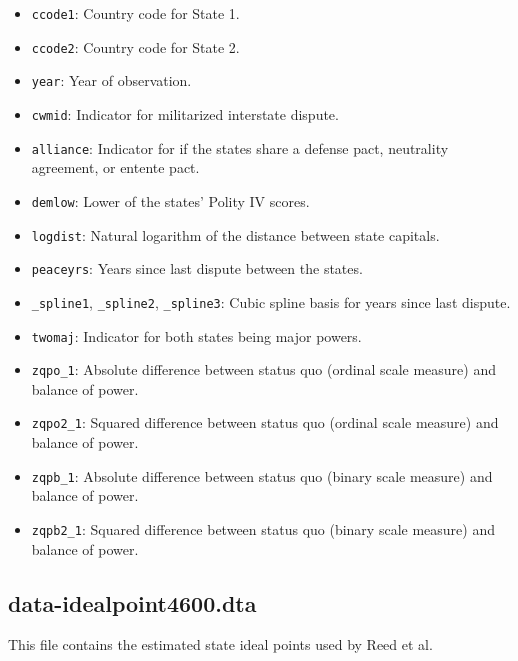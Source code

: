 \documentclass[12pt]{article}
\begin{document}
\begin{itemize}
  \item \texttt{ccode1}: Country code for State 1.
  \item \texttt{ccode2}: Country code for State 2.
  \item \texttt{year}: Year of observation.
  \item \texttt{cwmid}: Indicator for militarized interstate dispute.
  \item \texttt{alliance}: Indicator for if the states share a defense pact, neutrality agreement, or entente pact.
  \item \texttt{demlow}: Lower of the states' Polity IV scores.
  \item \texttt{logdist}: Natural logarithm of the distance between state capitals.
  \item \texttt{peaceyrs}: Years since last dispute between the states.
  \item \texttt{\_spline1}, \texttt{\_spline2}, \texttt{\_spline3}: Cubic spline basis for years since last dispute.
  \item \texttt{twomaj}: Indicator for both states being major powers.
  \item \texttt{zqpo\_1}: Absolute difference between status quo (ordinal scale measure) and balance of power.
  \item \texttt{zqpo2\_1}: Squared difference between status quo (ordinal scale measure) and balance of power.
  \item \texttt{zqpb\_1}: Absolute difference between status quo (binary scale measure) and balance of power.
  \item \texttt{zqpb2\_1}: Squared difference between status quo (binary scale measure) and balance of power.
\end{itemize}

\subsection{data-idealpoint4600.dta}

This file contains the estimated state ideal points used by Reed et al.
\end{document}

